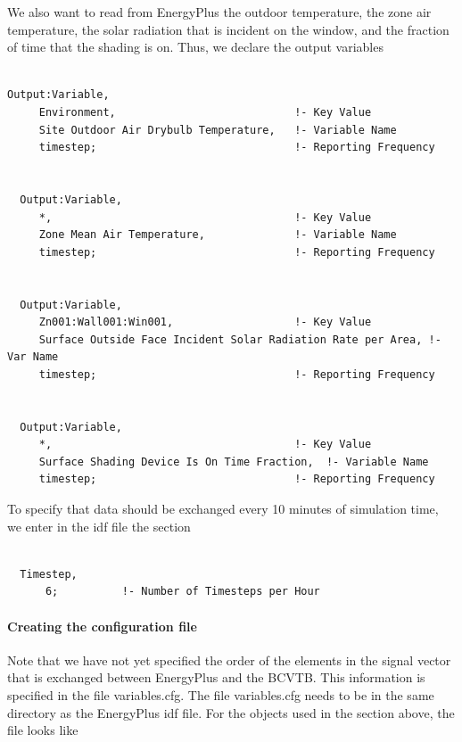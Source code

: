 We also want to read from EnergyPlus the outdoor temperature, the zone air temperature, the solar radiation that is incident on the window, and the fraction of time that the shading is on. Thus, we declare the output variables

\begin{lstlisting}

Output:Variable,
     Environment,                            !- Key Value
     Site Outdoor Air Drybulb Temperature,   !- Variable Name
     timestep;                               !- Reporting Frequency


  Output:Variable,
     *,                                      !- Key Value
     Zone Mean Air Temperature,              !- Variable Name
     timestep;                               !- Reporting Frequency


  Output:Variable,
     Zn001:Wall001:Win001,                   !- Key Value
     Surface Outside Face Incident Solar Radiation Rate per Area, !- Var Name
     timestep;                               !- Reporting Frequency


  Output:Variable,
     *,                                      !- Key Value
     Surface Shading Device Is On Time Fraction,  !- Variable Name
     timestep;                               !- Reporting Frequency
\end{lstlisting}

To specify that data should be exchanged every 10 minutes of simulation time, we enter in the idf file the section

\begin{lstlisting}

  Timestep,
      6;          !- Number of Timesteps per Hour
\end{lstlisting}

\paragraph{\texorpdfstring{\textbf{Creating the configuration file}}{Creating the configuration file}}\label{creating-the-configuration-file-1}

Note that we have not yet specified the order of the elements in the signal vector that is exchanged between EnergyPlus and the BCVTB. This information is specified in the file variables.cfg. The file variables.cfg needs to be in the same directory as the EnergyPlus idf file. For the objects used in the section above, the file looks like

